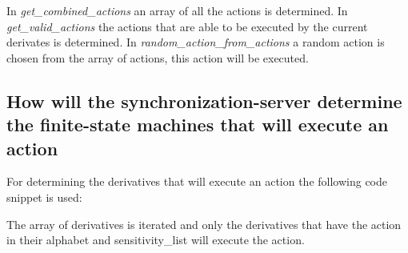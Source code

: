 \begin{Shaded}
\begin{Highlighting}[]
\NormalTok{\{}

\NormalTok{    \{}
\NormalTok{        \{}
            \NormalTok{;}
\NormalTok{        \}}
\NormalTok{    \}}

\NormalTok{\}}
\end{Highlighting}
\end{Shaded}

In \emph{get\_combined\_actions} an array of all the actions is
determined. In \emph{get\_valid\_actions} the actions that are able to
be executed by the current derivates is determined. In
\emph{random\_action\_from\_actions} a random action is chosen from the
array of actions, this action will be executed.

\hypertarget{how-will-the-synchronization-server-determine-the-finite-state-machines-that-will-execute-an-action}{%
\subsection{How will the synchronization-server determine the
finite-state machines that will execute an
action}\label{how-will-the-synchronization-server-determine-the-finite-state-machines-that-will-execute-an-action}}

For determining the derivatives that will execute an action the
following code snippet is used:

\begin{Shaded}
\begin{Highlighting}[]
\NormalTok{\{}
    \NormalTok{;}

\NormalTok{    \{}
\NormalTok{        \{}
\NormalTok{        \}}
\NormalTok{    \}}
\NormalTok{\}}
\end{Highlighting}
\end{Shaded}

The array of derivatives is iterated and only the derivatives that have
the action in their alphabet and sensitivity\_list will execute the
action.

